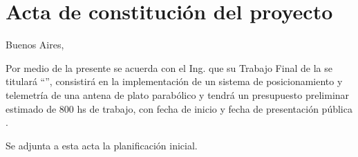 \documentclass[11pt, %
codirector, %
]{charter}
\begin{document}
\pagebreak



\section*{Acta de constitución del proyecto}
\label{sec:acta}

\begin{flushright}
Buenos Aires, \fechaInicioName
\end{flushright}

\vspace{2cm}

Por medio de la presente se acuerda con el Ing. \authorname que su Trabajo Final de la \degreename \hspace{0.2pt} se titulará ``\ttitle'', consistirá en la implementación de un sistema de posicionamiento y telemetría de una antena de plato parabólico y tendrá un presupuesto preliminar estimado de 800 hs de trabajo, con fecha de inicio \fechaInicioName \hspace{0.2pt} y fecha de presentación pública \fechaFinalName.

Se adjunta a esta acta la planificación inicial.

\vfill
\end{document}
